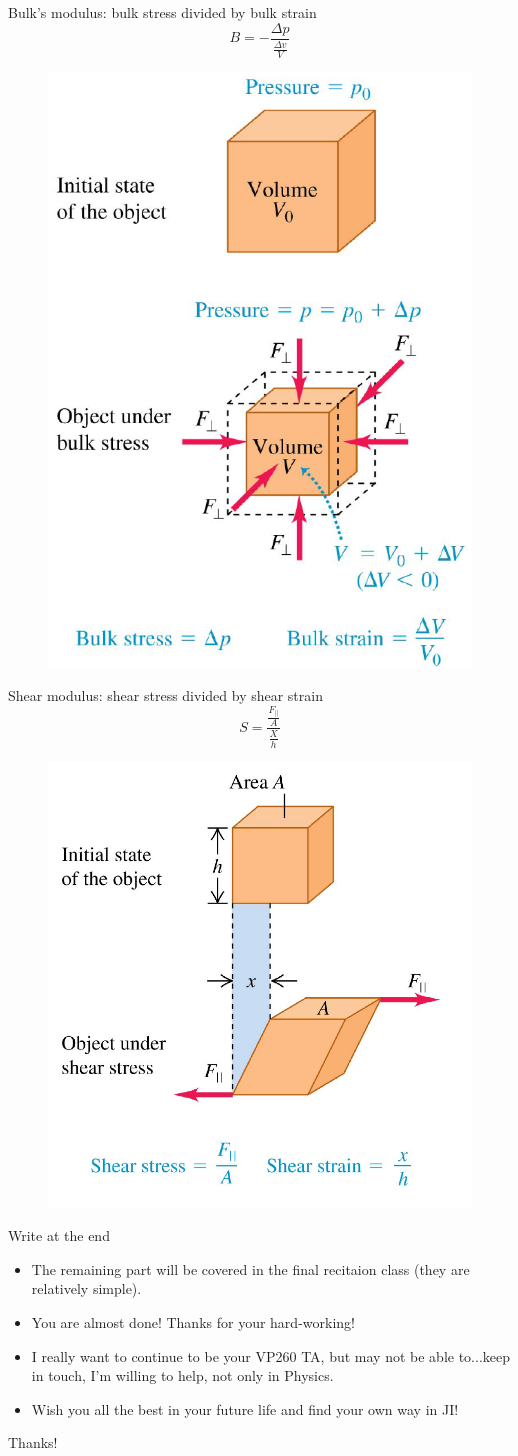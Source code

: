 \documentclass{beamer}
\begin{document}
\begin{frame}
  \begin{block}{Bulk's modulus: bulk stress divided by bulk strain}
    $$B=-\frac{\Delta p}{\frac{\Delta v}{V}}$$
  \end{block}\pause
  \begin{figure}[htbp]
  \centering
  \includegraphics[width=0.4 \linewidth, angle =0]{b's.png}
  \label{fig:b's}
  \end{figure}
\end{frame}

\begin{frame}
  \begin{block}{Shear modulus: shear stress divided by shear strain}
    $$S=\frac{\frac{F_{\|}}{A}}{\frac{X}{h}}$$
  \end{block}\pause
  \begin{figure}[htbp]
  \centering
  \includegraphics[width=0.4 \linewidth, angle =0]{s's.png}
  \label{fig:s's}
  \end{figure} 
\end{frame}

\begin{frame}{Write at the end}
  \begin{itemize}
    \item The remaining part will be covered in the final recitaion class (they are relatively simple).\pause
    \item You are almost done! Thanks for your hard-working!\pause
    \item I really want to continue to be your VP260 TA, but may not be able to...keep in touch, I'm willing to help, not only in Physics. \pause
    \item Wish you all the best in your future life and find your own way in JI!\pause
  \end{itemize}
  \centering
  \LARGE{Thanks!}
\end{frame}
\end{document}
